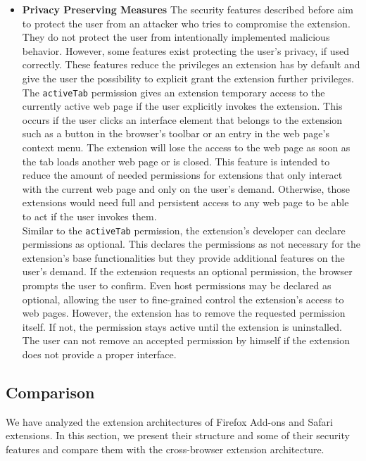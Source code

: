 \begin{itemize}
		\item \textbf{Privacy Preserving Measures} The security features described before aim to protect the user from an attacker who tries to compromise the extension. They do not protect the user from intentionally implemented malicious behavior. However, some features exist protecting the user's privacy, if used correctly. These features reduce the privileges an extension has by default and give the user the possibility to explicit grant the extension further privileges. \\
		The \texttt{activeTab} permission gives an extension temporary access to the currently active web page if the user explicitly invokes the extension. This occurs if the user clicks an interface element that belongs to the extension such as a button in the browser's toolbar or an entry in the web page's context menu. The extension will lose the access to the web page as soon as the tab loads another web page or is closed. This feature is intended to reduce the amount of needed permissions for extensions that only interact with the current web page and only on the user's demand. Otherwise, those extensions would need full and persistent access to any web page to be able to act if the user invokes them. \\
		Similar to the \texttt{activeTab} permission, the extension's developer can declare permissions as optional. This declares the permissions as not necessary for the extension's base functionalities but they provide additional features on the user's demand. If the extension requests an optional permission, the browser prompts the user to confirm. Even host permissions may be declared as optional, allowing the user to fine-grained control the extension's access to web pages. However, the extension has to remove the requested permission itself. If not, the permission stays active until the extension is uninstalled. The user can not remove an accepted permission by himself if the extension does not provide a proper interface. 		
	\end{itemize}

\subsection{Comparison}
	
	We have analyzed the extension architectures of Firefox Add-ons and Safari extensions. In this section, we present their structure and some of their security features and compare them with the cross-browser extension architecture.

